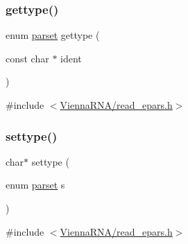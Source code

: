 \subsubsection{\texorpdfstring{gettype()}{gettype()}}
{\footnotesize\ttfamily enum \mbox{\hyperlink{group__energy__parameters__rw_ga7bf2bb363bcf5ce50d60255d256e5682}{parset}} gettype (\begin{DoxyParamCaption}\item[{const char $\ast$}]{ident }\end{DoxyParamCaption})}



{\ttfamily \#include $<$\mbox{\hyperlink{read__epars_8h}{Vienna\+R\+N\+A/read\+\_\+epars.\+h}}$>$}

\mbox{\label{group__energy__parameters__rw_ga0f228d51ba3fcd7dca0c991f37b2ed2a}} 
\subsubsection{\texorpdfstring{settype()}{settype()}}
{\footnotesize\ttfamily char$\ast$ settype (\begin{DoxyParamCaption}\item[{enum \mbox{\hyperlink{group__energy__parameters__rw_ga7bf2bb363bcf5ce50d60255d256e5682}{parset}}}]{s }\end{DoxyParamCaption})}



{\ttfamily \#include $<$\mbox{\hyperlink{read__epars_8h}{Vienna\+R\+N\+A/read\+\_\+epars.\+h}}$>$}

